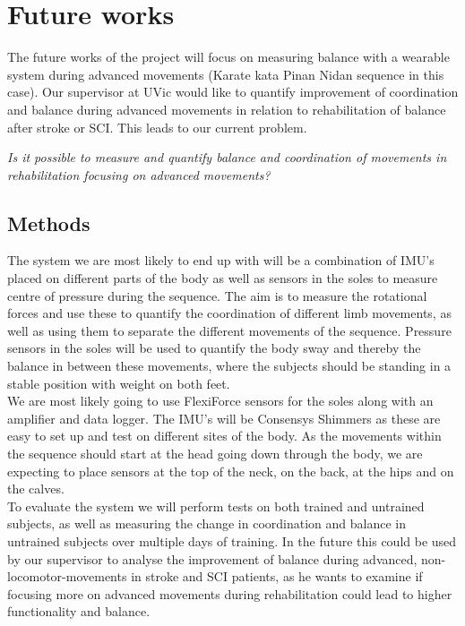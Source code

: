 \section{Future works}

The future works of the project will focus on measuring balance with a wearable system during advanced movements (Karate kata Pinan Nidan sequence in this case). Our supervisor at UVic would like to quantify improvement of coordination and balance during advanced movements in relation to rehabilitation of balance after stroke or SCI. This leads to our current problem.
\vspace{-0.5cm}
\begin{center}
\textit{Is it possible to measure and quantify balance and coordination of movements in rehabilitation focusing on advanced movements?}
\end{center}
\vspace{-1cm}
\subsection{Methods}

The system we are most likely to end up with will be a combination of IMU's placed on different parts of the body as well as sensors in the soles to measure centre of pressure during the sequence. The aim is to measure the rotational forces and use these to quantify the coordination of different limb movements, as well as using them to separate the different movements of the sequence. Pressure sensors in the soles will be used to quantify the body sway and thereby the balance in between these movements, where the subjects should be standing in a stable position with weight on both feet. \\
We are most likely going to use FlexiForce sensors for the soles along with an amplifier and data logger. The IMU's will be Consensys Shimmers as these are easy to set up and test on different sites of the body. As the movements within the sequence should start at the head going down through the body, we are expecting to place sensors at the top of the neck, on the back, at the hips and on the calves. \\
To evaluate the system we will perform tests on both trained and untrained subjects, as well as measuring the change in coordination and balance in untrained subjects over multiple days of training. In the future this could be used by our supervisor to analyse the improvement of balance during advanced, non-locomotor-movements in stroke and SCI patients, as he wants to examine if focusing more on advanced movements during rehabilitation could lead to higher functionality and balance. 